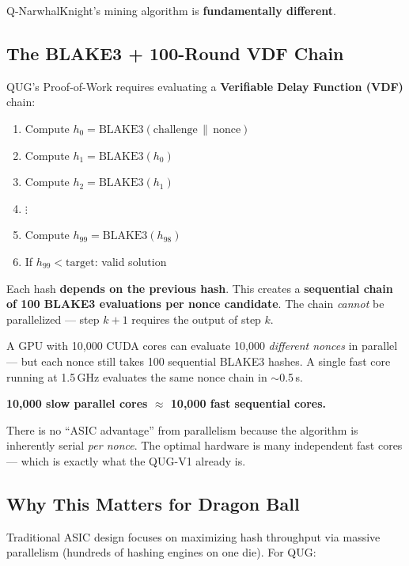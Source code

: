 \documentclass[11pt,a4paper]{article}
\begin{document}
Q-NarwhalKnight's mining algorithm is \textbf{fundamentally different}.

\subsection{The BLAKE3 + 100-Round VDF Chain}

QUG's Proof-of-Work requires evaluating a \textbf{Verifiable Delay Function (VDF)} chain:

\begin{enumerate}[leftmargin=1.5em]
    \item Compute $h_0 = \text{BLAKE3}(\text{challenge} \,\|\, \text{nonce})$
    \item Compute $h_1 = \text{BLAKE3}(h_0)$
    \item Compute $h_2 = \text{BLAKE3}(h_1)$
    \item[] $\vdots$
    \item Compute $h_{99} = \text{BLAKE3}(h_{98})$
    \item If $h_{99} < \text{target}$: valid solution
\end{enumerate}

Each hash \textbf{depends on the previous hash}. This creates a \textbf{sequential chain of 100 BLAKE3 evaluations per nonce candidate}. The chain \textit{cannot} be parallelized --- step $k+1$ requires the output of step $k$.

\begin{warningbox}
A GPU with 10{,}000 CUDA cores can evaluate 10{,}000 \textit{different nonces} in parallel --- but each nonce still takes 100 sequential BLAKE3 hashes. A single fast core running at 1.5\,GHz evaluates the same nonce chain in $\sim$0.5\,\textmu s.

\textbf{10{,}000 slow parallel cores $\approx$ 10{,}000 fast sequential cores.}

There is no ``ASIC advantage'' from parallelism because the algorithm is inherently serial \textit{per nonce}. The optimal hardware is many independent fast cores --- which is exactly what the QUG-V1 already is.
\end{warningbox}

\subsection{Why This Matters for Dragon Ball}

Traditional ASIC design focuses on maximizing hash throughput via massive parallelism (hundreds of hashing engines on one die). For QUG:
\end{document}
